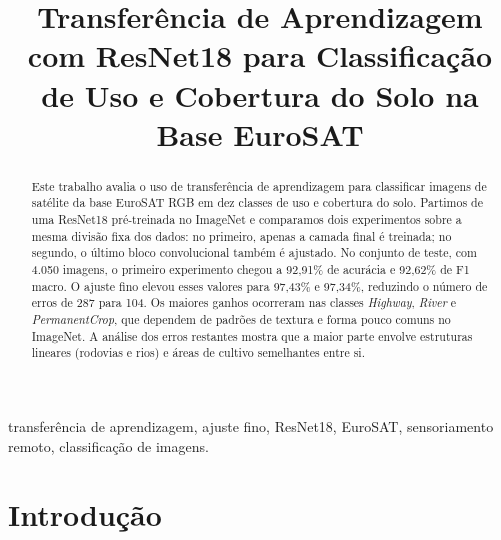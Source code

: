 \documentclass[conference,a4paper]{IEEEtran}
\begin{document}
\title{Transferência de Aprendizagem com ResNet18 para Classificação de Uso e Cobertura do Solo na Base EuroSAT}

\author{
}

\maketitle

\begin{abstract}
Este trabalho avalia o uso de transferência de aprendizagem para classificar imagens de satélite da base EuroSAT RGB em dez classes de uso e cobertura do solo. Partimos de uma ResNet18 pré-treinada no ImageNet e comparamos dois experimentos sobre a mesma divisão fixa dos dados: no primeiro, apenas a camada final é treinada; no segundo, o último bloco convolucional também é ajustado. No conjunto de teste, com 4.050 imagens, o primeiro experimento chegou a 92,91\% de acurácia e 92,62\% de F1 macro. O ajuste fino elevou esses valores para 97,43\% e 97,34\%, reduzindo o número de erros de 287 para 104. Os maiores ganhos ocorreram nas classes \textit{Highway}, \textit{River} e \textit{PermanentCrop}, que dependem de padrões de textura e forma pouco comuns no ImageNet. A análise dos erros restantes mostra que a maior parte envolve estruturas lineares (rodovias e rios) e áreas de cultivo semelhantes entre si.
\end{abstract}

\begin{IEEEkeywords}
transferência de aprendizagem, ajuste fino, ResNet18, EuroSAT, sensoriamento remoto, classificação de imagens.
\end{IEEEkeywords}

\section{Introdução}
\end{document}
